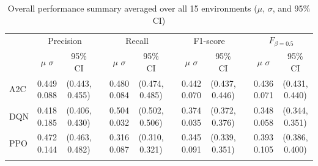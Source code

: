 \documentclass[12pt,oneside]{book}
\renewcommand{\arraystretch}{1.5}
\begin{document}
\begin{table}[htbp]
    \centering
    \caption{Overall performance summary averaged over all 15 environments ($\mu$, $\sigma$, and 95\% CI)}
    \label{tab:a2-overall-summary}
    \setlength{\tabcolsep}{5pt} 
    {\renewcommand{\arraystretch}{1.2}
    \begin{tabular}{@{}l cc c cc c cc c cc@{}}
        \arrayrulecolor{black!40}\toprule
        & \multicolumn{2}{c}{Precision} & & \multicolumn{2}{c}{Recall} & & \multicolumn{2}{c}{F1-score} & & \multicolumn{2}{c}{$F_{\beta=0.5}$} \\
        \cmidrule{2-3} \cmidrule{5-6} \cmidrule{8-9} \cmidrule{11-12}
        & \makecell{$\mu$ \\ $\sigma$} & 95\% CI & & \makecell{$\mu$ \\ $\sigma$} & 95\% CI & & \makecell{$\mu$ \\ $\sigma$} & 95\% CI & & \makecell{$\mu$ \\ $\sigma$} & 95\% CI \\ \midrule
        A2C & \makecell{0.449 \\ 0.088} & \makecell{(0.443,\\0.455)} & & \makecell{0.480 \\ 0.084} & \makecell{(0.474,\\0.485)} & & \makecell{0.442 \\ 0.070} & \makecell{(0.437,\\0.446)} & & \makecell{0.436 \\ 0.071} & \makecell{(0.431,\\0.440)} \\ \arrayrulecolor{gray!30}\midrule
        DQN & \makecell{0.418 \\ 0.185} & \makecell{(0.406,\\0.430)} & & \makecell{0.504 \\ 0.032} & \makecell{(0.502,\\0.506)} & & \makecell{0.374 \\ 0.035} & \makecell{(0.372,\\0.376)} & & \makecell{0.348 \\ 0.058} & \makecell{(0.344,\\0.351)} \\ \arrayrulecolor{gray!30}\midrule
        PPO & \makecell{0.472 \\ 0.144} & \makecell{(0.463,\\0.482)} & & \makecell{0.316 \\ 0.087} & \makecell{(0.310,\\0.321)} & & \makecell{0.345 \\ 0.091} & \makecell{(0.339,\\0.351)} & & \makecell{0.393 \\ 0.105} & \makecell{(0.386,\\0.400)} \\ \arrayrulecolor{gray!30}\midrule

\end{tabular}}
\end{table}
\end{document}
